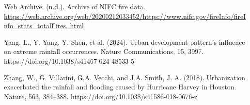 \documentclass[12pt,paper=a4,DIV=12,parskip=never,chapterprefix=false,headings=standardclasses]{scrreprt}
\begin{document}
Web Archive. (n.d.). Archive of NIFC fire data.
\url{https://web.archive.org/web/20200212033452/https://www.nifc.gov/fireInfo/fireInfo_stats_totalFires.
html}

Yang, L., Y. Yang, Y. Shen, et al. (2024). Urban development pattern’s influence on extreme rainfall
occurrences. Nature Communications, 15, 3997. https://doi.org/10.1038/s41467-024-48533-5

Zhang, W., G. Villarini, G.A. Vecchi, and J.A. Smith, J. A. (2018). Urbanization exacerbated the rainfall
and flooding caused by Hurricane Harvey in Houston. Nature, 563, 384–388.
https://doi.org/10.1038/s41586-018-0676-z
\endgroup


\end{document}
